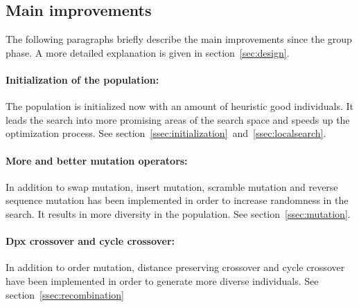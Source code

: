 \documentclass[a4paper,10pt]{article}
\newcommand{\ReplaceMe}[1]{{\color{blue}#1}}
\newcommand{\RemoveMe}[1]{{\color{purple}#1}}
\begin{document}

\subsection{Main improvements}

The following paragraphs briefly describe the main improvements since the group phase. A more detailed explanation is given in section~\ref{sec:design}.


\paragraph{Initialization of the population:} The population is initialized now with an amount of heuristic good individuals. It leads the search into more promising areas of the search space and speeds up the optimization process. See section~\ref{ssec:initialization}~and~\ref{ssec:localsearch}.
\paragraph{More and better mutation operators:} In addition to swap mutation, insert mutation, scramble mutation and reverse sequence mutation has been implemented in order to increase randomness in the search. It results in more diversity in the population. See section~\ref{ssec:mutation}.
\paragraph{Dpx crossover and cycle crossover:} In addition to order mutation, distance preserving crossover and cycle crossover have been implemented in order to generate more diverse individuals. See section~\ref{ssec:recombination}
\end{document}
